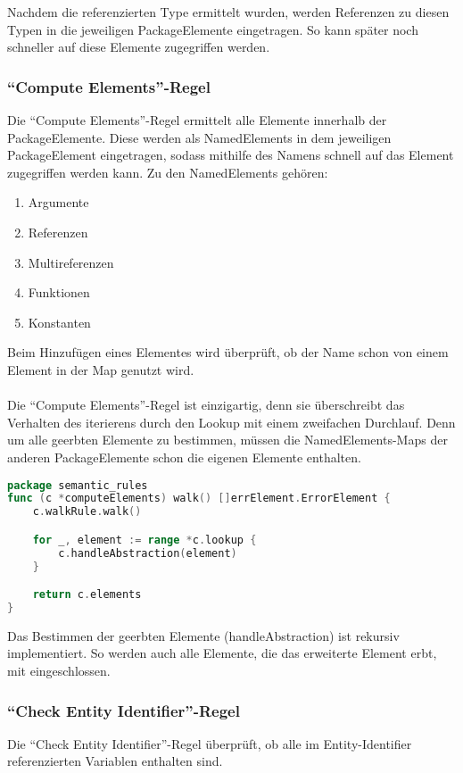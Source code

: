 \documentclass[./einleitung.tex]{subfiles}
\begin{document}
    Nachdem die referenzierten Type ermittelt wurden, werden Referenzen zu diesen Typen in die jeweiligen PackageElemente eingetragen.
    So kann später noch schneller auf diese Elemente zugegriffen werden.

    \subsubsection{``Compute Elements''-Regel}
    Die ``Compute Elements''-Regel ermittelt alle Elemente innerhalb der PackageElemente.
    Diese werden als NamedElements in dem jeweiligen PackageElement eingetragen, sodass mithilfe des Namens schnell auf das Element zugegriffen werden kann.
    Zu den NamedElements gehören:
    \begin{enumerate}
        \item Argumente
        \item Referenzen
        \item Multireferenzen
        \item Funktionen
        \item Konstanten
    \end{enumerate}
    Beim Hinzufügen eines Elementes wird überprüft, ob der Name schon von einem Element in der Map genutzt wird. \\ \\
    Die ``Compute Elements''-Regel ist einzigartig, denn sie überschreibt das Verhalten des iterierens durch den Lookup mit einem zweifachen Durchlauf.
    Denn um alle geerbten Elemente zu bestimmen, müssen die NamedElements-Maps der anderen PackageElemente schon die eigenen Elemente enthalten.
    \newpage
    \begin{lstlisting}[language=Go, caption=Implementierung der walk-Methode der ``Compute Supertypes''-Regel]
package semantic_rules
func (c *computeElements) walk() []errElement.ErrorElement {
	c.walkRule.walk()

	for _, element := range *c.lookup {
		c.handleAbstraction(element)
	}

	return c.elements
}
    \end{lstlisting}
    Das Bestimmen der geerbten Elemente (handleAbstraction) ist rekursiv implementiert.
    So werden auch alle Elemente, die das erweiterte Element erbt, mit eingeschlossen.

    \subsubsection{``Check Entity Identifier''-Regel}
    Die ``Check Entity Identifier''-Regel überprüft, ob alle im Entity-Identifier referenzierten Variablen enthalten sind.
\end{document}
